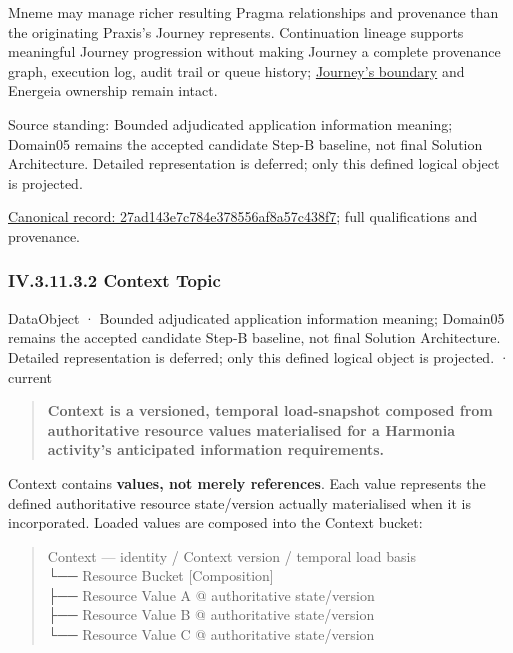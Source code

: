 Mneme may manage richer resulting Pragma relationships and provenance than the
originating Praxis's Journey represents. Continuation lineage supports meaningful
Journey progression without making Journey a complete provenance graph, execution
log, audit trail or queue history; \hyperref[element:359b901df27f4b43b5a2ff14a8484e34]{Journey's boundary}
and Energeia ownership remain intact.



Source standing: Bounded adjudicated application information meaning; Domain05 remains the accepted candidate Step-B baseline, not final Solution Architecture. Detailed representation is deferred; only this defined logical object is projected.


{\footnotesize \href{../../../../continuum/application/data-object/27ad143e7c784e378556af8a57c438f7.md}{Canonical record: 27ad143e7c784e378556af8a57c438f7}; full qualifications and provenance.}\par
\subsubsection*{IV.3.11.3.2 Context Topic}
\label{navigation:IV.3.11.3.2}

\label{element:76ded4866bf443dabc0849d68b215690}
{\small DataObject · Bounded adjudicated application information meaning; Domain05 remains the accepted candidate Step-B baseline, not final Solution Architecture. Detailed representation is deferred; only this defined logical object is projected. · current}\par

\begin{quote}


\textbf{Context is a versioned, temporal load-snapshot composed from authoritative
resource values materialised for a Harmonia activity's anticipated information
requirements.}



\end{quote}


Context contains \textbf{values, not merely references}. Each value represents the
defined authoritative resource state/version actually materialised when it is
incorporated. Loaded values are composed into the Context bucket:



\begin{quote}\small\ttfamily
Context — identity / Context version / temporal load basis\\
  └── Resource Bucket                         [Composition]\\
        ├── Resource Value A @ authoritative state/version\\
        ├── Resource Value B @ authoritative state/version\\
        └── Resource Value C @ authoritative state/version\\

\end{quote}


